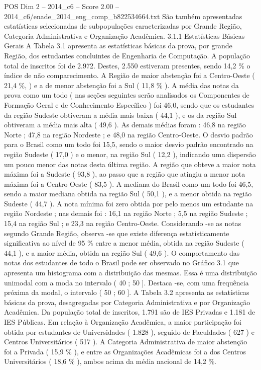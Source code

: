 \begin{textsample}{POS Dim 2 – 2014\_c6 – Score 2.00 – 2014\_c6/enade\_2014\_eng\_comp\_b822534664.txt}
São também apresentadas estatísticas selecionadas de subpopulações caracterizadas por Grande Região, Categoria Administrativa e Organização Acadêmica. 3.1.1 Estatísticas Básicas Gerais A Tabela 3.1 apresenta as estatísticas básicas da prova, por grande Região, dos estudantes concluintes de Engenharia de Computação.
A população total de inscritos foi de 2.972.
Destes, 2.550 estiveram presentes, sendo 14,2 \% o índice de não comparecimento.
A Região de maior abstenção foi a Centro-Oeste ( 21,4 \%, ) e a de menor abstenção foi a Sul ( 11,8 \% ).
A média das notas da prova como um todo ( nas seções seguintes serão analisados os Componentes de Formação Geral e de Conhecimento Específico ) foi 46,0, sendo que os estudantes da região Sudeste obtiveram a média mais baixa ( 44,1 ), e os da região Sul obtiveram a média mais alta ( 49,6 ).
As demais médias foram : 46,8 na região Norte ; 47,8 na região Nordeste ; e 48,0 na região Centro-Oeste.
O desvio padrão para o Brasil como um todo foi 15,5, sendo o maior desvio padrão encontrado na região Sudeste ( 17,0 ) e o menor, na região Sul ( 12,2 ), indicando uma dispersão um pouco menor das notas desta última região.
A região que obteve a maior nota máxima foi a Sudeste ( 93,8 ), ao passo que a região que atingiu a menor nota máxima foi a Centro-Oeste ( 83,5 ).
A mediana do Brasil como um todo foi 46,5, sendo a maior mediana obtida na região Sul ( 50,1 ), e a menor obtida na região Sudeste ( 44,7 ).
A nota mínima foi zero obtida por pelo menos um estudante na região Nordeste ; nas demais foi : 16,1 na região Norte ; 5,5 na região Sudeste ; 15,4 na região Sul ; e 23,3 na região Centro-Oeste.
Considerando -se as notas segundo Grande Região, observa -se que existe diferença estatisticamente significativa ao nível de 95 \% entre a menor média, obtida na região Sudeste ( 44,1 ), e a maior média, obtida na região Sul ( 49,6 ).
O comportamento das notas dos estudantes de todo o Brasil pode ser observado no Gráfico 3.1 que apresenta um histograma com a distribuição das mesmas.
Essa é uma distribuição unimodal com a moda no intervalo ( 40 ; 50 ].
Destaca -se, com uma frequência próxima da modal, o intervalo ( 50 ; 60 ].
A Tabela 3.2 apresenta as estatísticas básicas da prova, desagregadas por Categoria Administrativa e por Organização Acadêmica.
Da população total de inscritos, 1.791 são de IES Privadas e 1.181 de IES Públicas.
Em relação à Organização Acadêmica, a maior participação foi obtida por estudantes de Universidades ( 1.828 ), seguido de Faculdades ( 627 ) e Centros Universitários ( 517 ).
A Categoria Administrativa de maior abstenção foi a Privada ( 15,9 \% ), e entre as Organizações Acadêmicas foi a dos Centros Universitários ( 18,6 \% ), ambos acima da média nacional de 14,2 \%.

\end{textsample}
